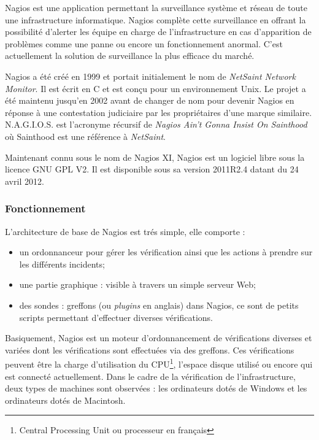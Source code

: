 Nagios est une application permettant la surveillance syst\`eme et r\'eseau de toute une infrastructure informatique.
Nagios compl\`ete cette surveillance en offrant la possibilit\'e d'alerter les \'equipe en charge de l'infrastructure en cas d'apparition de probl\`emes comme une panne ou encore un fonctionnement anormal.
C'est actuellement la solution de surveillance la plus efficace du march\'e.

Nagios a \'et\'e cr\'e\'e en 1999 et portait initialement le nom de \textit{NetSaint Network Monitor}.
Il est \'ecrit en C et est con\c{c}u pour un environnement Unix.
Le projet a \'et\'e maintenu jusqu'en 2002 avant de changer de nom pour devenir Nagios en r\'eponse \`a une contestation judiciaire par les propri\'etaires d'une marque similaire.
N.A.G.I.O.S. est l'acronyme r\'ecursif de \og{}\textit{Nagios Ain't Gonna Insist On Sainthood}\fg{} o\`u Sainthood est une r\'ef\'erence \`a \textit{NetSaint}.

Maintenant connu sous le nom de Nagios XI, Nagios est un logiciel libre sous la licence GNU GPL V2. Il est disponible sous sa version 2011R2.4 datant du 24 avril 2012.

\subsubsection{Fonctionnement}

\noindent L'architecture de base de Nagios est tr\'es simple, elle comporte :

\begin{itemize}
	\item un ordonnanceur pour g\'erer les v\'erification ainsi que les actions \`a prendre sur les diff\'erents incidents;
	\item une partie graphique : visible \`a travers un simple serveur Web;
	\item des sondes : greffons (ou \textit{plugins} en anglais) dans Nagios, ce sont de petits scripts permettant d'effectuer diverses v\'erifications.

\end{itemize}

\vspace{0.20cm}

Basiquement, Nagios est un moteur d'ordonnancement de v\'erifications diverses et vari\'ees dont les v\'erifications sont effectu\'ees via des greffons.
Ces v\'erifications peuvent \^etre la charge d'utilisation du CPU\protect\footnote{Central Processing Unit ou processeur en fran\c{c}ais}, l'espace disque utilis\'e ou encore qui est connect\'e actuellement.
Dans le cadre de la v\'erification de l'infrastructure, deux types de machines sont observ\'ees : les ordinateurs dot\'es de Windows et les ordinateurs dot\'es de Macintosh.

